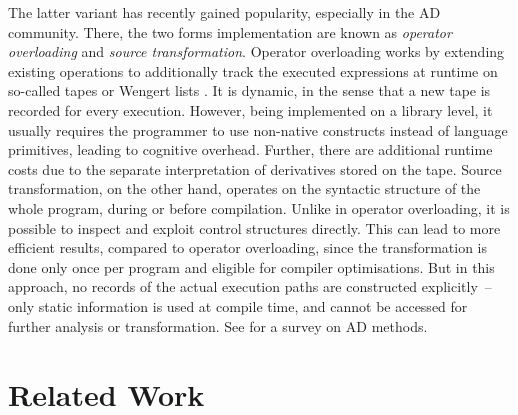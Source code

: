 The latter variant has recently gained popularity, especially in the AD community.
There, the two forms implementation are known as \emph{operator overloading} and \emph{source
  transformation}.  Operator overloading works by extending existing operations to
additionally track the executed expressions at runtime on so-called tapes or Wengert lists
\cite{bartholomew-biggs2000automatic}. It is dynamic, in the sense that a new tape is recorded for every
execution.  However, being implemented on a library level, it usually requires the programmer to use
non-native constructs instead of language primitives, leading to cognitive overhead. Further, there
are additional runtime costs due to the separate interpretation of derivatives stored on the
tape. Source transformation, on the other hand, operates on the syntactic structure of the whole
program, during or before compilation. Unlike in operator overloading, it is possible to inspect and
exploit control structures directly. This can lead to more efficient results, compared to operator
overloading, since the transformation is done only once per program and eligible for compiler
optimisations. But in this approach, no records of the actual execution paths are constructed
explicitly~-- only static information is used at compile time, and cannot be accessed for further
analysis or transformation. See \cite{baydin2018automatic} for a survey on AD methods.



\section{Related Work}
\label{sec:related-work}



